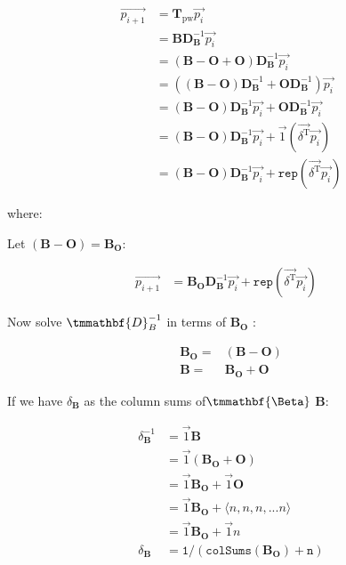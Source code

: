 \documentclass[11pt]{report}
\begin{document}
\begin{align}
  \overrightarrow{p_{i + 1}} & = \mathbf{T}_{\mathrm{pw}}
  \overrightarrow{p_i}\\
& = \mathbf{BD}_{\mathbf{B}}^{- 1}
  \overrightarrow{p_i}\\
  & = \left( \mathbf{B} - \mathbf{O} + \mathbf{O} \right)
  \mathbf{D}_{\mathbf{B}}^{- 1} \overrightarrow{p_i}\\
  & = \left( \left( \mathbf{B} - \mathbf{O} \right)
  \mathbf{D}_{\mathbf{B}}^{- 1} + \mathbf{OD}_{\mathbf{B}}^{- 1} \right)
  \overrightarrow{p_i}\\
  & = \left( \mathbf{B} - \mathbf{O} \right) \mathbf{D}_{\mathbf{B}}^{- 1}
  \overrightarrow{p_i} + \mathbf{OD}_{\mathbf{B}}^{- 1} \overrightarrow{p_i}\\
  & = \left( \mathbf{B} - \mathbf{O} \right) \mathbf{D}_{\mathbf{B}}^{- 1}
  \overrightarrow{p_i} + \vec{1} (\overrightarrow{\delta^{\mathrm{T}}}
  \overrightarrow{p_i}) \\
  & = \left( \mathbf{B} - \mathbf{O} \right) \mathbf{D}_{\mathbf{B}}^{- 1}
  \overrightarrow{p_i} + \mathtt{rep} (\overrightarrow{\delta^{\mathrm{T}}}
  \overrightarrow{p_i})
\end{align}

where:


Let \((\mathbf{B}-\mathbf{O}) = \mathbf{B_{\mathbf{O}}}\):

\begin{eqnarray*}
  \overrightarrow{p_{i + 1}} & = \mathbf{B_{\mathbf{O}}} \mathbf{D}_{\mathbf{B}}^{- 1}
  \overrightarrow{p_i} + \mathtt{rep} (\overrightarrow{\delta^{\mathrm{T}}}
  \overrightarrow{p_i}) &
\end{eqnarray*}

Now solve \(\tmmathbf{D}_B^{- 1}\) in terms of \(\mathbf{B_{O}}\) :

\begin{align}
  \mathbf{B}_{\mathbf{\mathbf{O}}} = & (\mathbf{B}-\mathbf{O})\\
  \mathbf{B} = & \mathbf{B}_{\mathbf{\mathbf{O}}}
  +\mathbf{O}
\end{align}

If we have \(\delta_{\mathbf{B}}\) as the column sums of\(\tmmathbf{\Beta}\) \(\mathbf{B}\):

\begin{align}
\delta^{-1}_{\mathbf{B}} &= \vec{1}\mathbf{B} \\
&= \vec{1} \left( \mathbf{B_{O}} + \mathbf{O}\right) \\
&= \vec{1}  \mathbf{B_{O}} + \vec{1}\mathbf{O} \\
&= \vec{1} \mathbf{B_{\mathbf{O}}} + \langle n, n, n, ... n \rangle \\
&= \vec{1} \mathbf{B_{\mathbf{O}}} + \vec{1} n \\
\delta_{\mathbf{B}}&=\mathtt{1/(colSums(\mathbf{B_{O}}) + n )}
\end{align}
\end{document}
